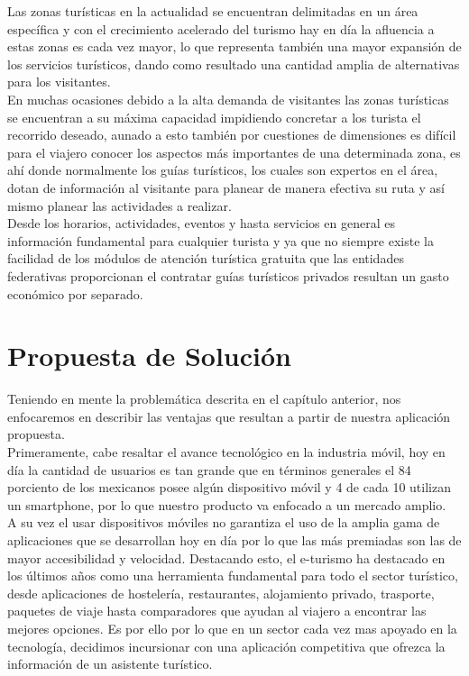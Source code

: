 	Las zonas turísticas en la actualidad se encuentran delimitadas en un área específica y con el crecimiento acelerado del turismo hay en día la afluencia a estas zonas es cada vez mayor, lo que representa también una mayor expansión de los servicios turísticos, dando como resultado una cantidad amplia de alternativas para los visitantes.\\
	
	En muchas ocasiones debido a la alta demanda de visitantes las zonas turísticas se encuentran a su máxima capacidad impidiendo concretar a los turista el recorrido deseado, aunado a esto también por cuestiones de dimensiones es difícil para el viajero conocer los aspectos más importantes de una determinada zona, es ahí donde normalmente los guías turísticos, los cuales son expertos en el área, dotan de información al visitante para planear de manera efectiva su ruta y así mismo planear las actividades a realizar.\\
	
	Desde los horarios, actividades, eventos y hasta servicios en general es información fundamental para cualquier turista y ya que no siempre existe la facilidad de los módulos de atención turística gratuita que las entidades federativas proporcionan el contratar guías turísticos privados resultan un gasto económico por separado.


\section{Propuesta de Solución}


	Teniendo en mente la problemática descrita en el capítulo anterior, nos enfocaremos en describir las ventajas que resultan a partir de nuestra aplicación propuesta.\\ 
	
	Primeramente, cabe resaltar el avance tecnológico en la industria móvil, hoy en día la cantidad de usuarios es tan grande que en términos generales el 84 porciento de los mexicanos posee algún dispositivo móvil y 4 de cada 10 utilizan un smartphone, por lo que nuestro producto va enfocado a un mercado amplio.\\ 
	
	A su vez el usar dispositivos móviles no garantiza el uso de la amplia gama de aplicaciones que se desarrollan hoy en día por lo que las más premiadas son las de mayor accesibilidad y velocidad. Destacando esto, el e-turismo ha destacado en los últimos años como una herramienta fundamental para todo el sector turístico, desde aplicaciones de hostelería, restaurantes, alojamiento privado, trasporte, paquetes de viaje hasta comparadores que ayudan al viajero a encontrar las mejores opciones. Es por ello por lo que en un sector cada vez mas apoyado en la tecnología, decidimos incursionar con una aplicación competitiva que ofrezca la información de un asistente turístico.\\
	

